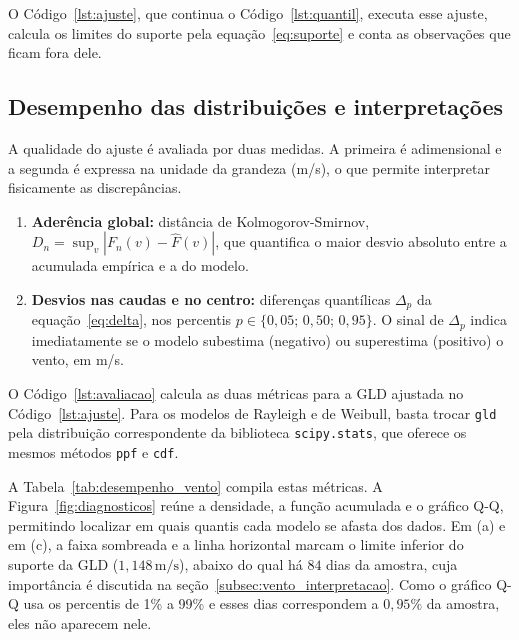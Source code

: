 O Código~\ref{lst:ajuste}, que continua o Código~\ref{lst:quantil}, executa esse ajuste, calcula os limites do suporte pela equação~\eqref{eq:suporte} e conta as observações que ficam fora dele.



\subsection{Desempenho das distribuições e interpretações}

A qualidade do ajuste é avaliada por duas medidas. A primeira é adimensional e a segunda é expressa na unidade da grandeza (m/s), o que permite interpretar fisicamente as discrepâncias.

\begin{enumerate}
    \item \textbf{Aderência global:} distância de Kolmogorov-Smirnov, $D_n = \sup_v |F_n(v) - \widehat{F}(v)|$, que quantifica o maior desvio absoluto entre a acumulada empírica e a do modelo.
    \item \textbf{Desvios nas caudas e no centro:} diferenças quantílicas $\Delta_p$ da equação~\eqref{eq:delta}, nos percentis $p \in \{0,05;\, 0,50;\, 0,95\}$. O sinal de $\Delta_p$ indica imediatamente se o modelo subestima (negativo) ou superestima (positivo) o vento, em m/s.
\end{enumerate}

O Código~\ref{lst:avaliacao} calcula as duas métricas para a GLD ajustada no Código~\ref{lst:ajuste}. Para os modelos de Rayleigh e de Weibull, basta trocar \texttt{gld} pela distribuição correspondente da biblioteca \texttt{scipy.stats}, que oferece os mesmos métodos \texttt{ppf} e \texttt{cdf}.



A Tabela~\ref{tab:desempenho_vento} compila estas métricas. A Figura~\ref{fig:diagnosticos} reúne a densidade, a função acumulada e o gráfico Q-Q, permitindo localizar em quais quantis cada modelo se afasta dos dados. Em (a) e em (c), a faixa sombreada e a linha horizontal marcam o limite inferior do suporte da GLD ($1,148\,\text{m/s}$), abaixo do qual há $84$ dias da amostra, cuja importância é discutida na seção~\ref{subsec:vento_interpretacao}. Como o gráfico Q-Q usa os percentis de 1\% a 99\% e esses dias correspondem a $0,95\%$ da amostra, eles não aparecem nele.

